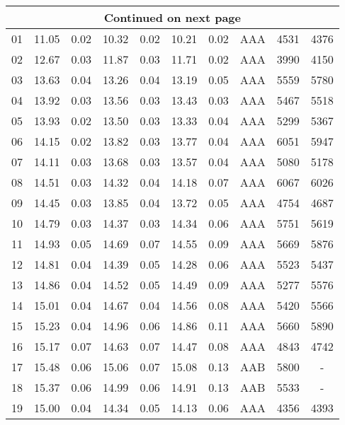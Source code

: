 \begin{longtable}{cccccccccc}
\hline \multicolumn{10}{c}{{Continued on next page}} \\ \hline
\endfoot
\hline \hline
\endfoot
\rowcolor[gray]{0.9}  01 & 11.05 & 0.02 & 10.32 & 0.02 & 10.21 & 0.02 & AAA & 4531 & 4376\\
\rowcolor[gray]{0.9}  02 & 12.67 & 0.03 & 11.87 & 0.03 & 11.71 & 0.02 & AAA & 3990 & 4150\\
\rowcolor[gray]{0.9}  03 & 13.63 & 0.04 & 13.26 & 0.04 & 13.19 & 0.05 & AAA & 5559 & 5780\\
\rowcolor[gray]{0.9}  04 & 13.92 & 0.03 & 13.56 & 0.03 & 13.43 & 0.03 & AAA & 5467 & 5518\\
\rowcolor[gray]{0.9}  05 & 13.93 & 0.02 & 13.50 & 0.03 & 13.33 & 0.04 & AAA & 5299 & 5367\\
\rowcolor[gray]{0.9}  06 & 14.15 & 0.02 & 13.82 & 0.03 & 13.77 & 0.04 & AAA & 6051 & 5947\\
\rowcolor[gray]{0.9}  07 & 14.11 & 0.03 & 13.68 & 0.03 & 13.57 & 0.04 & AAA & 5080 & 5178\\
\rowcolor[gray]{0.9}  08 & 14.51 & 0.03 & 14.32 & 0.04 & 14.18 & 0.07 & AAA & 6067 & 6026\\
\rowcolor[gray]{0.9}  09 & 14.45 & 0.03 & 13.85 & 0.04 & 13.72 & 0.05 & AAA & 4754 & 4687\\
\rowcolor[gray]{0.9}  10 & 14.79 & 0.03 & 14.37 & 0.03 & 14.34 & 0.06 & AAA & 5751 & 5619\\
\rowcolor[gray]{0.9}  11 & 14.93 & 0.05 & 14.69 & 0.07 & 14.55 & 0.09 & AAA & 5669 & 5876\\
\rowcolor[gray]{0.9}  12 & 14.81 & 0.04 & 14.39 & 0.05 & 14.28 & 0.06 & AAA & 5523 & 5437\\
\rowcolor[gray]{0.9}  13 & 14.86 & 0.04 & 14.52 & 0.05 & 14.49 & 0.09 & AAA & 5277 & 5576\\
\rowcolor[gray]{0.9}  14 & 15.01 & 0.04 & 14.67 & 0.04 & 14.56 & 0.08 & AAA & 5420 & 5566\\
\rowcolor[gray]{0.9}  15 & 15.23 & 0.04 & 14.96 & 0.06 & 14.86 & 0.11 & AAA & 5660 & 5890\\
\rowcolor[gray]{0.9}  16 & 15.17 & 0.07 & 14.63 & 0.07 & 14.47 & 0.08 & AAA & 4843 & 4742\\
\rowcolor[gray]{0.9}  17 & 15.48 & 0.06 & 15.06 & 0.07 & 15.08 & 0.13 & AAB & 5800 & -\\
\rowcolor[gray]{0.9}  18 & 15.37 & 0.06 & 14.99 & 0.06 & 14.91 & 0.13 & AAB & 5533 & -\\
\rowcolor[gray]{0.9}  19 & 15.00 & 0.04 & 14.34 & 0.05 & 14.13 & 0.06 & AAA & 4356 & 4393\\

\end{longtable}
